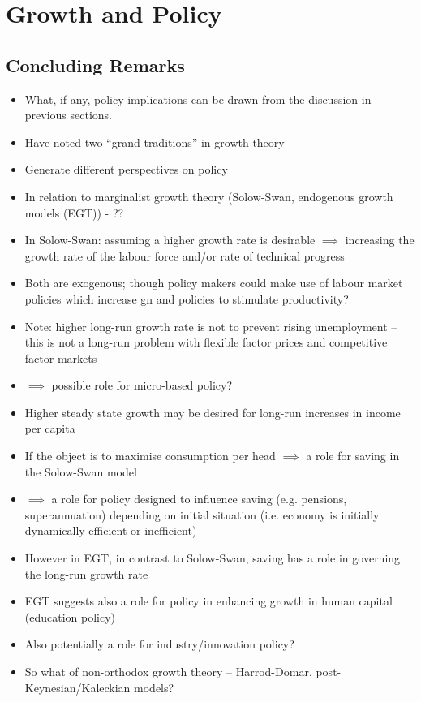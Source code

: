 \documentclass[a4paper,twoside]{article}
\numberwithin{equation}{section}
\numberwithin{figure}{section}
\begin{document}
\section{Growth and Policy}
\subsection{Concluding Remarks}
\begin{itemize}
	\item What, if any, policy implications can be drawn from the discussion in previous sections.
	\item Have noted two ``grand traditions'' in growth theory
	\item Generate different perspectives on policy
	\item In relation to marginalist growth theory (Solow-Swan, endogenous growth models (EGT)) - ??
	\item In Solow-Swan: assuming a higher growth rate is desirable \( \implies \) increasing the growth rate of the labour force and/or rate of technical progress
	\item Both are exogenous; though policy makers could make use of labour market policies which increase gn and policies to stimulate productivity?
	\item Note: higher long-run growth rate is not to prevent rising unemployment -- this is not a long-run problem with flexible factor prices and competitive factor markets
	\item \( \implies \) possible role for micro-based policy?
	\item Higher steady state growth may be desired for long-run increases in income per capita
	\item If the object is to maximise consumption per head \( \implies \) a role for saving in the Solow-Swan model
	\item \( \implies \) a role for policy designed to influence saving (e.g. pensions, superannuation) depending on initial situation (i.e. economy is initially dynamically efficient or inefficient)
	\item However in EGT, in contrast to Solow-Swan, saving has a role in governing the long-run growth rate
	\item EGT suggests also a role for policy in enhancing growth in human capital (education policy)
	\item Also potentially a role for industry/innovation policy?
	\item So what of non-orthodox growth theory -- Harrod-Domar, post-Keynesian/Kaleckian models?

\end{itemize}
\end{document}
